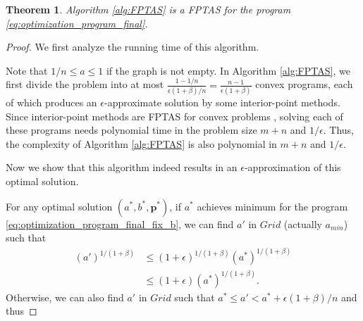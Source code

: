 \documentclass[letterpaper]{article} %
\newtheorem{theorem}{Theorem}
\newcommand{\probdistri}{\mathbf{p}}
\newcommand{\complexbound}{\beta}
\newcommand{\red}[1]{\textcolor{red}{#1}}
\newcommand{\todo}[1]{\red{\textsc{todo:} #1}}
\begin{document}

\begin{theorem}
\label{th:fptas}
  Algorithm \ref{alg:FPTAS} is a FPTAS for the program \eqref{eq:optimization_program_final}.
\end{theorem}

\begin{proof}%
We first analyze the running time of this algorithm.   

  Note that $1/n\le a\le 1$ if the graph is not empty. %
  In Algorithm \ref{alg:FPTAS}, we first divide the problem into at most
  $\frac{1-1/n}{\epsilon(1+\beta)/n}=\frac{n-1}{\epsilon(1+\complexbound{})}$
  convex programs, each of which produces an $\epsilon$-approximate solution by some interior-point methods. 
  Since interior-point methods are FPTAS for convex problems \cite{boyd2004convex}, solving each of these programs needs polynomial time in the problem size $m+n$ and $1/\epsilon$. 
  Thus, the complexity of Algorithm \ref{alg:FPTAS} is also polynomial in $m+n$ and $1/\epsilon$.

Now we show that this algorithm indeed results in an $\epsilon$-approximation of this optimal solution. 

For any optimal solution $(a^*, b^*, \probdistri{}^*)$, %
if $a^*$ achieves minimum for the program %
\eqref{eq:optimization_program_final_fix_b}, we can find $a'$ in $Grid$ (actually $a_{min}$) such that 
  \begin{equation}
  \begin{aligned}
    \label{eq:a_mini_bound}
    (a')^{1/(1+\complexbound{})}&\le (1+\epsilon)^{1/(1+\complexbound{})}(a^*)^{1/(1+\complexbound{})}\\
    &\le (1+\epsilon)(a^*)^{1/(1+\complexbound{})}.
    \end{aligned}
  \end{equation}
  Otherwise, we can also find $a'$ in $Grid$ such that $a^*\le a'<a^*+\epsilon(1+\beta)/n$ and thus


\end{proof}
\end{document}
